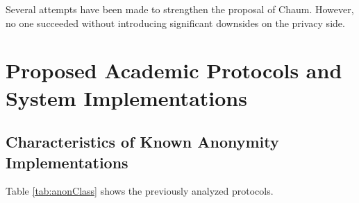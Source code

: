 Several attempts have been made to strengthen the proposal of Chaum\cite{golle:eurocrypt2004,disco,herbivore:tr,Corrigan-Gibbs:2010:DAA:1866307.1866346}. However, no one succeeded without introducing significant downsides on the privacy side.

\chapter{Proposed Academic Protocols and System Implementations\label{sec:implSystems}}
\section{Characteristics of Known Anonymity Implementations}
Table \ref{tab:anonClass} shows the previously analyzed protocols.

